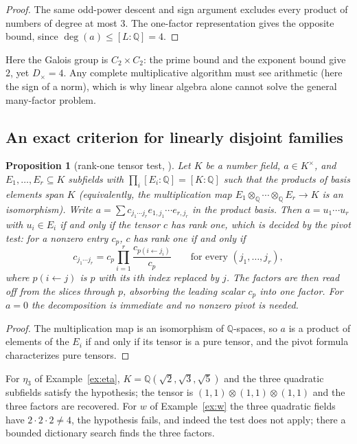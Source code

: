 \documentclass[11pt,a4paper]{article}
\newtheorem{proposition}[theorem]{Proposition}
\theoremstyle{definition}
\theoremstyle{remark}
\newcommand{\Q}{\mathbb{Q}}
\newcommand{\dg}{\deg}
\newcommand{\Dt}{D_{\times}}
\begin{document}
\begin{proof}
The same odd-power descent and sign argument excludes every product of numbers of degree at most
$3$.  The one-factor representation gives the opposite bound, since $\dg(a)\le[L:\Q]=4$.
\end{proof}

Here the Galois group is $C_2\times C_2$: the prime bound and the exponent bound give $2$, yet
$\Dt=4$.  Any complete multiplicative algorithm must see arithmetic (here the sign of a norm), which is
why linear algebra alone cannot solve the general many-factor problem.

\subsection{An exact criterion for linearly disjoint families}

\begin{proposition}[rank-one tensor test, \cite{r9}]\label{prop:tensor}
Let $K$ be a number field, $a\in K^\times$, and $E_1,\dots,E_r\subseteq K$ subfields with $\prod_i[E_i:\Q]=[K:\Q]$ such
that the products of basis elements span $K$ (equivalently, the multiplication map
$E_1\otimes_\Q\cdots\otimes_\Q E_r\to K$ is an isomorphism).  Write $a=\sum c_{j_1\cdots j_r}
e_{1,j_1}\cdots e_{r,j_r}$ in the product basis.  Then $a=u_1\cdots u_r$ with $u_i\in E_i$ if and only
if the tensor $c$ has rank one, which is decided by the pivot test: for a nonzero entry $c_p$, $c$ has
rank one if and only if
\[
 c_{j_1\cdots j_r}=c_p\prod_{i=1}^r\frac{c_{p(i\leftarrow j_i)}}{c_p}
 \qquad\text{for every }(j_1,\dots,j_r),
\]
where $p(i\leftarrow j)$ is $p$ with its $i$th index replaced by $j$.  The factors are then read off
from the slices through $p$, absorbing the leading scalar $c_p$ into one factor.  For $a=0$ the
decomposition is immediate and no nonzero pivot is needed.
\end{proposition}

\begin{proof}
The multiplication map is an isomorphism of $\Q$-spaces, so $a$ is a product of elements of the $E_i$
if and only if its tensor is a pure tensor, and the pivot formula characterizes pure tensors.
\end{proof}

For $\eta_3$ of Example~\ref{ex:eta}, $K=\Q(\sqrt2,\sqrt3,\sqrt5)$ and the three quadratic subfields
satisfy the hypothesis; the tensor is $(1,1)\otimes(1,1)\otimes(1,1)$ and the three factors are
recovered.  For $w$ of Example~\ref{ex:w} the three quadratic fields have $2\cdot2\cdot2\ne4$, the
hypothesis fails, and indeed the test does not apply; there a bounded dictionary search finds the
three factors.
\end{document}

